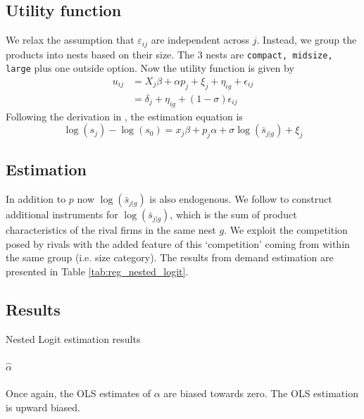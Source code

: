 \documentclass[12pt]{article}
\begin{document}
\subsection{Utility function}
We relax the assumption that $\varepsilon_{ij}$ are independent across $j$.
Instead, we group the products into nests based on their size. The 3 nests are
\verb|compact, midsize, large| plus one outside option. Now the utility
function is given by
\begin{equation}
    \begin{split}
        u_{ij} & =X_{j}\beta + \alpha p_{j} + \xi_{j}+ \eta_{ig}+ \epsilon_{ij} \\
               & =\delta_j+\eta_{ig}+(1-\sigma)\epsilon_{ij}
    \end{split}
\end{equation}
Following the derivation in \citet{berry1994estimating}, the estimation equation is
\begin{equation}
    \log(s_j)-\log(s_0)=x_j\beta+p_j\alpha+\sigma\log(\bar{s}_{j|g})+\xi_j
\end{equation}
\subsection{Estimation}
In addition to $p$ now $\log(\bar{s}_{j|g})$ is also endogenous. We follow
\citep{berry1994estimating} to construct additional instruments for
$\log(\bar{s}_{j|g})$, which is the sum of product characteristics of the rival
firms in the same nest $g$. We exploit the competition posed by rivals with the
added feature of this `competition' coming from within the same group (i.e.
size category). The results from demand estimation are presented in Table
\ref{tab:reg_nested_logit}.

\subsection{Results}
\begin{table}[h!]\fontsize{10pt}{12pt}\selectfont
    \centering
    
    \caption{Nested Logit estimation results}
    \label{tab:reg_nested_logit}
\end{table}

\paragraph{$\hat{\alpha}$} Once again, the OLS estimates of $\alpha$ are biased towards zero. The OLS estimation is upward biased.
\end{document}
